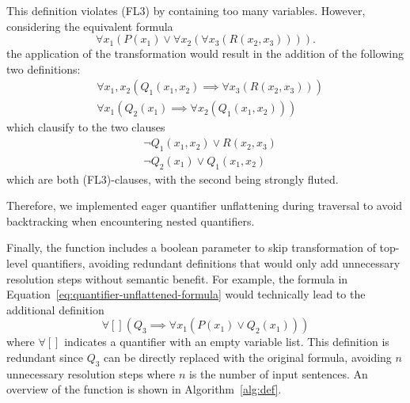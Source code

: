 \noindent This definition violates (FL3) by containing too many variables.
However, considering the equivalent formula
\begin{equation}\label{eq:quantifier-unflattened-formula}
  \forall x_1 (P(x_1) \lor \forall x_2(\forall x_3 (R(x_2,x_3)))).
\end{equation}
the application of the transformation would result in the addition of the following two definitions:
\begin{equation*}
  \begin{aligned}
    &\forall x_1,x_2 (Q_1(x_1,x_2) \implies \forall x_3 (R(x_2,x_3))) \\
    &\forall x_1 (Q_2(x_1) \implies \forall x_2 (Q_1(x_1,x_2)))
  \end{aligned}
\end{equation*}
which clausify to the two clauses
\begin{equation*}
  \begin{aligned}
    &\neg Q_1(x_1,x_2) \lor R(x_2,x_3) \\
    &\neg Q_2(x_1) \lor Q_1(x_1,x_2)
  \end{aligned}
\end{equation*}
which are both (FL3)-clauses, with the second being strongly fluted.

\noindent Therefore, we implemented eager quantifier unflattening during traversal to avoid backtracking when encountering nested quantifiers.

Finally, the  function includes a boolean parameter to skip transformation of top-level quantifiers, avoiding redundant definitions that would only add unnecessary resolution steps without semantic benefit.
For example, the formula in Equation~\ref{eq:quantifier-unflattened-formula} would technically lead to the additional definition
\[
  \forall [] (Q_3 \implies \forall x_1 (P(x_1) \lor Q_2(x_1)))
\]
where \(\forall []\) indicates a quantifier with an empty variable list.
This definition is redundant since \(Q_3\) can be directly replaced with the original formula, avoiding \(n\) unnecessary resolution steps where \(n\) is the number of input sentences.
An overview of the  function is shown in Algorithm~\ref{alg:def}.

